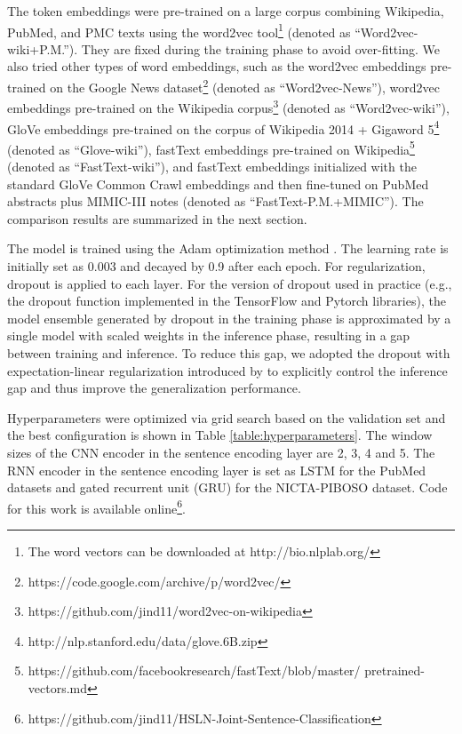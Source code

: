 \documentclass[11pt,a4paper]{article}
\begin{document}
The token embeddings were pre-trained on a large corpus combining Wikipedia, PubMed, and PMC texts \cite{moen2013distributional} using the word2vec tool\footnote{The word vectors can be downloaded at http://bio.nlplab.org/} (denoted as ``Word2vec-wiki+P.M.''). They are fixed during the training phase to avoid over-fitting. We also tried other types of word embeddings, such as the word2vec embeddings pre-trained on the Google News dataset\footnote{https://code.google.com/archive/p/word2vec/} (denoted as ``Word2vec-News''), word2vec embeddings pre-trained on the Wikipedia corpus\footnote{https://github.com/jind11/word2vec-on-wikipedia} (denoted as ``Word2vec-wiki''), GloVe embeddings pre-trained on the corpus of Wikipedia 2014 + Gigaword 5\footnote{http://nlp.stanford.edu/data/glove.6B.zip} (denoted as ``Glove-wiki''), fastText embeddings pre-trained on Wikipedia\footnote{https://github.com/facebookresearch/fastText/blob/master/ pretrained-vectors.md} (denoted as ``FastText-wiki''), and fastText embeddings initialized with the standard GloVe Common Crawl embeddings and then fine-tuned on PubMed abstracts plus MIMIC-III notes (denoted as ``FastText-P.M.+MIMIC''). The comparison results are summarized in the next section.


The model is trained using the Adam optimization method \cite{kingma2014adam}. The learning rate is initially set as 0.003 and decayed by 0.9 after each epoch. For regularization, dropout \cite{srivastava2014dropout} is applied to each layer. For the version of dropout used in practice (e.g., the dropout function implemented in the TensorFlow and Pytorch libraries), the model ensemble generated by dropout in the training phase is approximated by a single model with scaled weights in the inference phase, resulting in a gap between training and inference. To reduce this gap, we adopted the dropout with expectation-linear regularization introduced by \citet{ma2016dropout} to explicitly control the inference gap and thus improve the generalization performance.


Hyperparameters were optimized via grid search based on the validation set and the best configuration is shown in Table \ref{table:hyperparameters}. The window sizes of the CNN encoder in the sentence encoding layer are 2, 3, 4 and 5. The RNN encoder in the sentence encoding layer is set as LSTM for the PubMed datasets and gated recurrent unit (GRU) for the NICTA-PIBOSO dataset. Code for this work is available online\footnote{https://github.com/jind11/HSLN-Joint-Sentence-Classification}.
\end{document}
